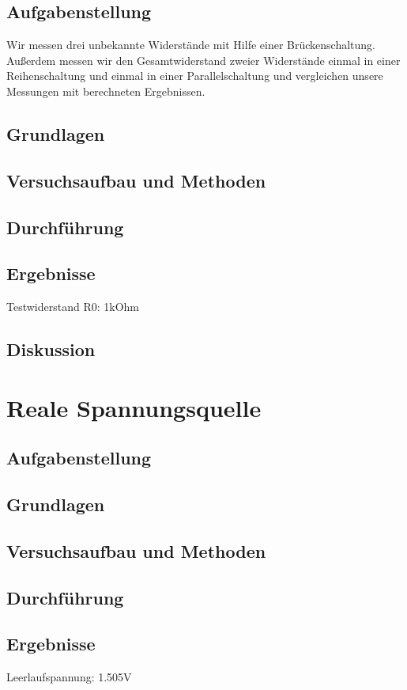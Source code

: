 \documentclass{article}
\begin{document}
\subsection{Aufgabenstellung}
Wir messen drei unbekannte Widerstände mit Hilfe einer Brückenschaltung.
Außerdem messen wir den Gesamtwiderstand zweier Widerstände einmal in einer Reihenschaltung und einmal in einer Parallelschaltung und vergleichen unsere Messungen mit berechneten Ergebnissen.
\subsection{Grundlagen}
\subsection{Versuchsaufbau und Methoden}
\subsection{Durchführung}
\subsection{Ergebnisse}
Testwiderstand R0: 1kOhm
\subsection{Diskussion}

\section{Reale Spannungsquelle}

\subsection{Aufgabenstellung}
\subsection{Grundlagen}
\subsection{Versuchsaufbau und Methoden}
\subsection{Durchführung}
\subsection{Ergebnisse}
Leerlaufspannung:
1.505V
\end{document}

